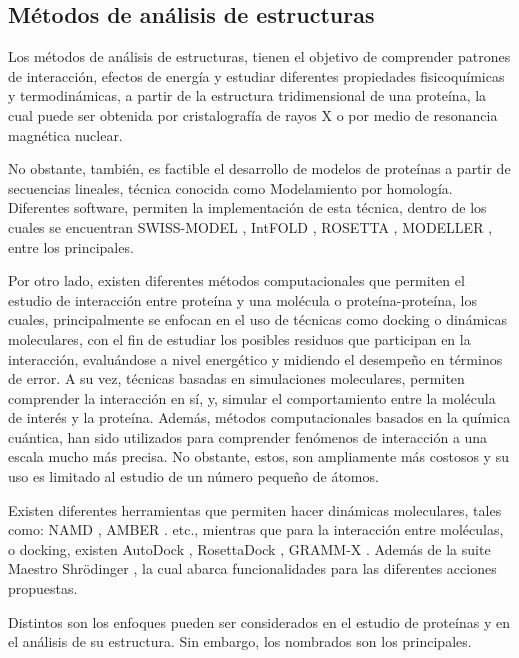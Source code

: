 \subsection{Métodos de análisis de estructuras}

Los métodos de análisis de estructuras, tienen el objetivo de comprender patrones de interacción, efectos de energía y estudiar diferentes propiedades fisicoquímicas y termodinámicas, a partir de la estructura tridimensional de una proteína, la cual puede ser obtenida por cristalografía de rayos X o por medio de resonancia magnética nuclear.

No obstante, también, es factible el desarrollo de modelos de proteínas a partir de secuencias lineales, técnica conocida como Modelamiento por homología. Diferentes software, permiten la implementación de esta técnica, dentro de los cuales se encuentran SWISS-MODEL \cite{Guex1997}, IntFOLD \cite{mcguffin2015intfold}, ROSETTA \cite{leaver2011rosetta3}, MODELLER \cite{eswar2006comparative}, entre los principales. 

Por otro lado, existen diferentes métodos computacionales que permiten el estudio de interacción entre proteína y una molécula o proteína-proteína, los cuales, principalmente se enfocan en el uso de técnicas como docking o dinámicas moleculares, con el fin de estudiar los posibles residuos que participan en la interacción, evaluándose a nivel energético y midiendo el desempeño en términos de error. A su vez, técnicas basadas en simulaciones moleculares, permiten comprender la interacción en sí, y, simular el comportamiento entre la molécula de interés y la proteína. Además, métodos computacionales basados en la química cuántica, han sido utilizados para comprender fenómenos de interacción a una escala mucho más precisa. No obstante, estos, son ampliamente más costosos y su uso es limitado al estudio de un número pequeño de átomos. 

Existen diferentes herramientas que permiten hacer dinámicas moleculares, tales como: NAMD \cite{phillips2005scalable}, AMBER \cite{case2005amber}. etc., mientras que para la interacción entre moléculas, o docking, existen AutoDock \cite{trott2010autodock}, RosettaDock \cite{lyskov2008rosettadock}, GRAMM-X \cite{tovchigrechko2006gramm}. Además de la suite Maestro Shr\"odinger \cite{release20161}, la cual abarca funcionalidades para las diferentes acciones propuestas. 

Distintos son los enfoques pueden ser considerados en el estudio de proteínas y en el análisis de su estructura. Sin embargo, los nombrados son los principales.
 
